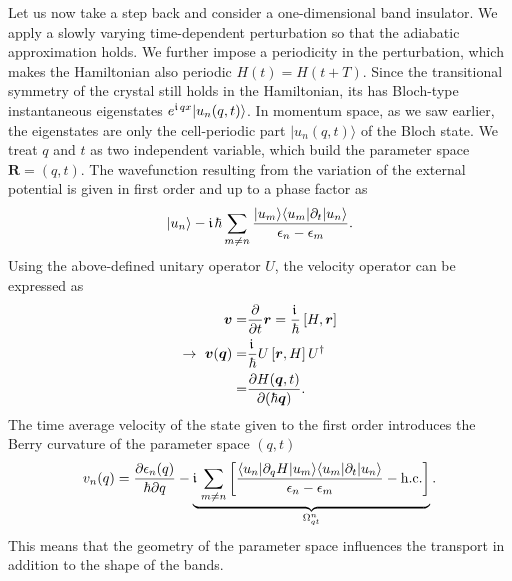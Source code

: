 \documentclass[../main]{subfiles}
\begin{document}
    Let us now take a step back and consider a one-dimensional band insulator. We apply a slowly varying time-dependent perturbation so that the adiabatic approximation holds.
    We further impose a periodicity in the perturbation, which makes the Hamiltonian also periodic $H(t) = H(t+T)$. Since the transitional symmetry of the crystal still holds in the Hamiltonian,
    its has Bloch-type instantaneous eigenstates $e^{\large\mathfrak{i}\hspace*{1.3pt}\normalsize qx}|u_n(q,t)\rangle$. In momentum space, as we saw earlier, the eigenstates are only the cell-periodic part $|u_n(q,t)\rangle$ of the Bloch state.
    We treat $q$ and $t$ as two independent variable, which build the parameter space $\bm{R}=(q,t)$. The wavefunction resulting from the variation of the external potential is given in first order
    and up to a phase factor as \cite{Xiao2010-lt}
    \begin{align*}
        |u_n\rangle - \large\mathfrak{i}\hspace*{1.3pt}\normalsize\hbar \sum_{m\neq n}\frac{|u_m\rangle\langle u_m| \partial_t|u_n\rangle}{\epsilon_n - \epsilon_m}.
    \end{align*}
    Using the above-defined unitary operator $U$, the velocity operator can be expressed as
    \begin{align*}
        \bm{v} =& \frac{\partial }{\partial t}\bm{r} = \frac{\large\mathfrak{i}\hspace*{1.3pt}\normalsize}{\hbar}\left[H,\bm{r}\right]\\
       \rightarrow ~ \bm{v}(\bm{q}) =& \frac{\large\mathfrak{i}\hspace*{1.3pt}\normalsize}{\hbar}U\left[\bm{r},H\right]U^{\dagger}\\
        =& \frac{\partial H(\bm{q},t)}{\partial(\hbar\bm{q})}.
    \end{align*}
    The time average velocity of the state given to the first order introduces the Berry curvature of the parameter space $(q,t)$
    \begin{align} \label{eq:Berry_velo}
        v_n(q) = \frac{\partial\epsilon_n(q)}{\hbar\partial q} - \underbrace{\large\mathfrak{i}\hspace*{1.3pt}\normalsize  \sum_{m\neq n}\left[\frac{\langle u_n|\partial_q H |u_m\rangle\langle u_m| 
        \partial_t | u_n\rangle}{\epsilon_n - \epsilon_m} -  \mathrm{h.c.}\right]}_{\Omega^n_{qt}}.
    \end{align} 
    This means that the geometry of the parameter space influences the transport in addition to the shape of the bands. 
\end{document}
